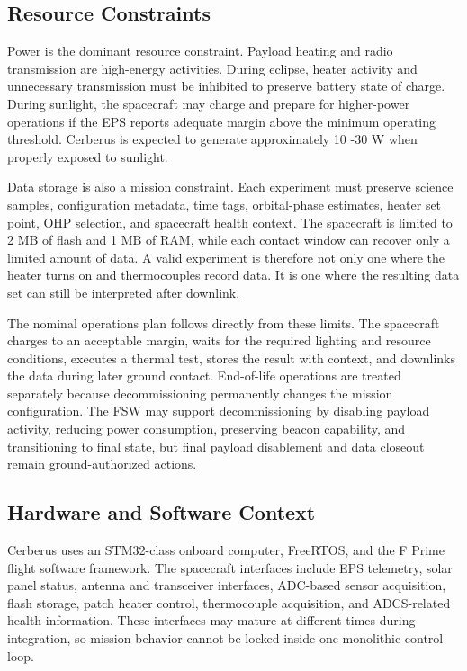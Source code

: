 \documentclass[10pt,letterpaper,twoside,fleqn]{article}
\newcommand{\Indent}{\hspace*{4\fontdimen2\font}}
\begin{document}
\subsection{Resource Constraints}

\Indent
Power is the dominant resource constraint. Payload heating and radio transmission are high-energy activities. During eclipse, heater activity and unnecessary transmission must be inhibited to preserve battery state of charge. During sunlight, the spacecraft may charge and prepare for higher-power operations if the EPS reports adequate margin above the minimum operating threshold. Cerberus is expected to generate approximately 10 -30 W when properly exposed to sunlight.

Data storage is also a mission constraint. Each experiment must preserve science samples, configuration metadata, time tags, orbital-phase estimates, heater set point, OHP selection, and spacecraft health context. The spacecraft is limited to 2 MB of flash and 1 MB of RAM, while each contact window can recover only a limited amount of data. A valid experiment is therefore not only one where the heater turns on and thermocouples record data. It is one where the resulting data set can still be interpreted after downlink.

The nominal operations plan follows directly from these limits. The spacecraft charges to an acceptable margin, waits for the required lighting and resource conditions, executes a thermal test, stores the result with context, and downlinks the data during later ground contact. End-of-life operations are treated separately because decommissioning permanently changes the mission configuration. The FSW may support decommissioning by disabling payload activity, reducing power consumption, preserving beacon capability, and transitioning to final state, but final payload disablement and data closeout remain ground-authorized actions.

\subsection{Hardware and Software Context}

\Indent
Cerberus uses an STM32-class onboard computer, FreeRTOS, and the F Prime flight software framework. The spacecraft interfaces include EPS telemetry, solar panel status, antenna and transceiver interfaces, ADC-based sensor acquisition, flash storage, patch heater control, thermocouple acquisition, and ADCS-related health information. These interfaces may mature at different times during integration, so mission behavior cannot be locked inside one monolithic control loop.
\end{document}
